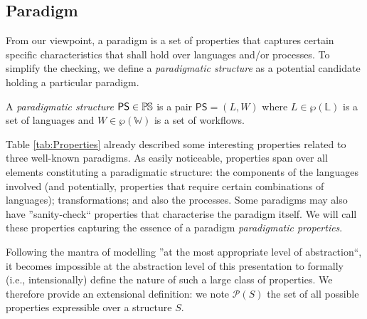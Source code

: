 \subsection{Paradigm}
\label{sec:PS}

From our viewpoint, a paradigm is a set of properties that captures 
certain specific characteristics that shall hold over languages and/or 
processes. To simplify the checking, we define a \emph{paradigmatic structure} 
as a potential candidate holding a particular paradigm.

\begin{Definition}
   A \emph{paradigmatic structure} $\mathsf{PS}\in \mathbb{P}\mskip-1mu\mathbb{S}$ is a pair $\mathsf{PS} 
= (L, W)$ where $L\in \wp(\mathbb{L})$ is a set of languages and 
$W \in \wp(\mathbb{W})$ is a set of workflows.
\end{Definition}

Table \ref{tab:Properties} already described some interesting properties 
related to three well-known paradigms. As easily noticeable, properties span 
over all elements constituting a paradigmatic structure: the components of the 
languages involved (and potentially, properties that require certain 
combinations of languages); transformations; and also the processes. Some 
paradigms may also have ''sanity-check`` properties that characterise the 
paradigm itself. We will call these properties capturing the essence of a 
paradigm \emph{paradigmatic properties}.

Following the mantra of modelling ''at the most appropriate 
level of abstraction``, it becomes impossible at the abstraction level of this 
presentation to formally (i.e., intensionally) define the nature of such a large 
class of properties. We therefore provide an extensional definition: we note 
$\mathcal{P}(S)$ the set of all possible properties expressible over a 
structure $S$. 

